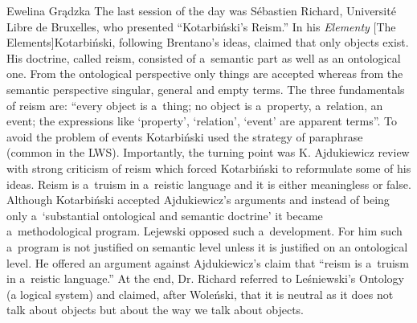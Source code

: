 \begin{editorialeng}{Ewelina Grądzka}
The last session of the day was Sébastien Richard, Université Libre de Bruxelles, who presented ``Kotarbiński’s Reism.'' In his \textit{Elementy} [The Elements]Kotarbiński, following Brentano’s ideas, claimed that only objects exist. His doctrine, called reism, consisted of a~semantic part as well as an ontological one. From the ontological perspective only things are accepted whereas from the semantic perspective singular, general and empty terms. The three fundamentals of reism are: ``every object is a~thing; no object is a~property, a~relation, an event; the expressions like ‘property’, ‘relation’, ‘event’ are apparent terms''. To avoid the problem of events Kotarbiński used the strategy of paraphrase (common in the LWS). Importantly, the turning point was K. Ajdukiewicz review with strong criticism of reism which forced Kotarbiński to reformulate some of his ideas. Reism is a~truism in a~reistic language and it is either meaningless or false. Although Kotarbiński accepted Ajdukiewicz’s arguments and instead of being only a~‘substantial ontological and semantic doctrine’ it became a~methodological program. Lejewski opposed such a~development. For him such a~program is not justified on semantic level unless it is justified on an ontological level. He offered an argument against Ajdukiewicz’s claim that ``reism is a~truism in a~reistic language.'' At the end, Dr. Richard referred to Leśniewski’s Ontology (a logical system) and claimed, after Woleński, that it is neutral as it does not talk about objects but about the way we talk about objects.


\end{editorialeng}
